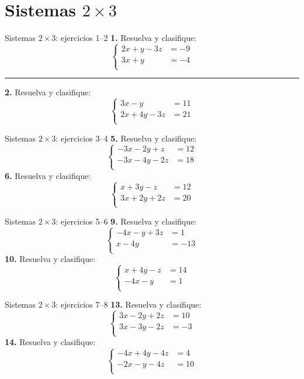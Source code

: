 \documentclass[aspectratio=169]{beamer}
\begin{document}
\section{Sistemas $2\times 3$}
\begin{frame}{Sistemas $2\times 3$: ejercicios 1--2}
\small
\textbf{1.} Resuelva y clasifique:
\[\left\{\begin{aligned}
2x+y-3z&=-9\\
3x+y&=-4\\
\end{aligned}\right.\]
\vspace{0.2em}\hrule\vspace{0.3em}
\textbf{2.} Resuelva y clasifique:
\[\left\{\begin{aligned}
3x-y&=11\\
2x+4y-3z&=21\\
\end{aligned}\right.\]
\end{frame}
\begin{frame}{Sistemas $2\times 3$: ejercicios 3--4}
\small
\textbf{5.} Resuelva y clasifique:
\[\left\{\begin{aligned}
-3x-2y+z&=12\\
-3x-4y-2z&=18\\
\end{aligned}\right.\]
\textbf{6.} Resuelva y clasifique:
\[\left\{\begin{aligned}
x+3y-z&=12\\
3x+2y+2z&=20\\
\end{aligned}\right.\]
\end{frame}
\begin{frame}{Sistemas $2\times 3$: ejercicios 5--6}
\small
\textbf{9.} Resuelva y clasifique:
\[\left\{\begin{aligned}
-4x-y+3z&=1\\
x-4y&=-13\\
\end{aligned}\right.\]
\textbf{10.} Resuelva y clasifique:
\[\left\{\begin{aligned}
x+4y-z&=14\\
-4x-y&=1\\
\end{aligned}\right.\]
\end{frame}
\begin{frame}{Sistemas $2\times 3$: ejercicios 7--8}
\small
\textbf{13.} Resuelva y clasifique:
\[\left\{\begin{aligned}
3x-2y+2z&=10\\
3x-3y-2z&=-3\\
\end{aligned}\right.\]
\textbf{14.} Resuelva y clasifique:
\[\left\{\begin{aligned}
-4x+4y-4z&=4\\
-2x-y-4z&=10\\
\end{aligned}\right.\]
\end{frame}
\end{document}
